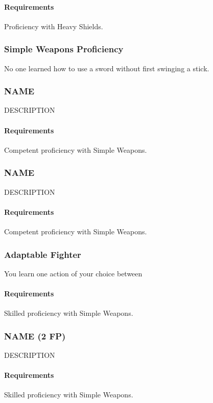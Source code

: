     \paragraph{Requirements} Proficiency with Heavy Shields.

\subsubsection{Simple Weapons Proficiency} \label{feat::name}
    No one learned how to use a sword without first swinging a stick.
\subsubsection{NAME} \label{feat::name}
    DESCRIPTION
    \paragraph{Requirements} Competent proficiency with Simple Weapons.
\subsubsection{NAME} \label{feat::name}
    DESCRIPTION
    \paragraph{Requirements} Competent proficiency with Simple Weapons.
\subsubsection{Adaptable Fighter} \label{feat::adaptablefighter}
    You learn one action of your choice between %
    \paragraph{Requirements} Skilled proficiency with Simple Weapons.
\subsubsection{NAME (2 FP)} \label{feat::name}
    DESCRIPTION
    \paragraph{Requirements} Skilled proficiency with Simple Weapons.
